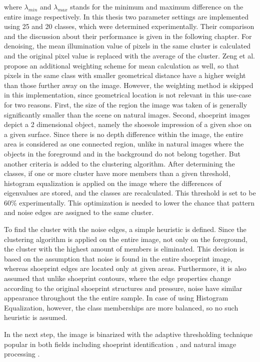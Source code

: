 \documentclass[draft,final]{vutinfth} %
\begin{document}
where $\lambda_{min}$ and $\lambda_{max}$ stands for the minimum and maximum difference on the entire image respectively.
In this thesis two parameter settings are implemented using 25 and 20 classes, which were determined experimentally.
Their comparison and the discussion about their performance is given in the following chapter.
For denoising, the mean illumination value of pixels in the same cluster is calculated and the original pixel value is replaced with the average of the cluster.
Zeng et al. \cite{zeng2011region} propose an additional weighting scheme for mean calculation as well, so that pixels in the same class with smaller geometrical distance have a higher weight than those further away on the image.
However, the weighting method is skipped in this implementation, since geometrical location is not relevant in this use-case for two reasons.
First, the size of the region the image was taken of is generally significantly smaller than the scene on natural images.
Second, shoeprint images depict a 2 dimensional object, namely the shoesole impression of a given shoe on a given surface. 
Since there is no depth difference within the image, the entire area is considered as one connected region, unlike in natural images where the objects in the foreground and in the background do not belong together.
But another criteria is added to the clustering algorithm.
After determining the classes, if one or more cluster have more members than a given threshold, histogram equalization is applied on the image where the differences of eigenvalues are stored, and the classes are recalculated.
This threshold is set to be 60\% experimentally.
This optimization is needed to lower the chance that pattern and noise edges are assigned to the same cluster. 
\par
To find  the cluster with the noise edges, a simple heuristic is defined.
Since the clustering algorithm is applied on the entire image, not only on the foreground, the cluster with the highest amount of members is eliminated.
This decision is based on the assumption that noise is found in the entire shoeprint image, whereas shoeprint edges are located only at given areas.
Furthermore, it is also assumed that unlike shoeprint contours, where the edge properties change according to the original shoeprint structures and pressure, noise have similar appearance throughout the the entire sample.
In case of using Histogram Equalization, however, the class memberships are more balanced, so no such heuristic is assumed.
\par
In the next step, the image is binarized with the adaptive thresholding technique \cite{laine1996multiscale} popular in both fields including shoeprint identification  \cite{wang2014automatic}, \cite{li2014retrieval} and natural image processing \cite{xu2016image}.
\end{document}
